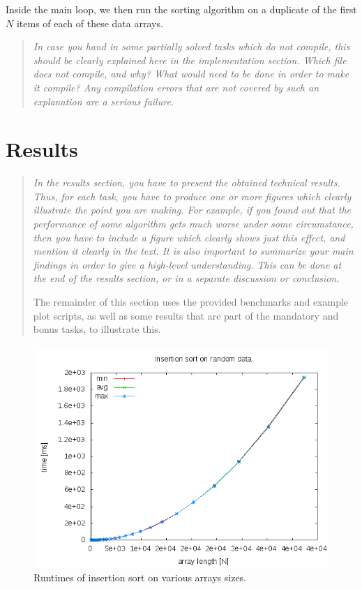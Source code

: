 \documentclass[a4paper,10pt]{article}
\begin{document}
Inside the main loop, we then run the sorting algorithm on a duplicate of the first $N$ items of each of these data arrays.

\begin{quotation}
  \itshape
  In case you hand in some partially solved tasks which do not compile, this should be clearly explained here in the implementation section.
  Which file does not compile, and why?
  What would need to be done in order to make it compile?
  Any compilation errors that are not covered by such an explanation are a serious failure.
\end{quotation}



\section{Results}

\begin{quotation}
  \itshape
  In the results section, you have to present the obtained technical results.
  Thus, for each task, you have to produce one or more figures which clearly illustrate the point you are making.
  For example, if you found out that the performance of some algorithm gets much worse under some circumstance, then you have to include a figure which clearly shows just this effect, and mention it clearly in the text.
  It is also important to summarize your main findings in order to give a high-level understanding.
  This can be done at the end of the results section, or in a separate discussion or conclusion.
  
  The remainder of this section uses the provided benchmarks and example plot scripts, as well as some results that are part of the mandatory and bonus tasks, to illustrate this.
\end{quotation}

\begin{figure}
  \centering
  \includegraphics[width=0.8\columnwidth]{../examples/isort-example.png}
  \caption{
    Runtimes of insertion sort on various arrays sizes.
  }\label{fig:isort}
\end{figure}
\end{document}
